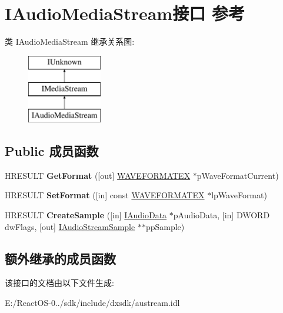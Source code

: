 \hypertarget{interface_i_audio_media_stream}{}\section{I\+Audio\+Media\+Stream接口 参考}
\label{interface_i_audio_media_stream}
类 I\+Audio\+Media\+Stream 继承关系图\+:\begin{figure}[H]
\begin{center}
\leavevmode
\includegraphics[height=3.000000cm]{interface_i_audio_media_stream}
\end{center}
\end{figure}
\subsection*{Public 成员函数}
\begin{DoxyCompactItemize}
\item 
\mbox{\label{interface_i_audio_media_stream_a274b9d811563ae79051cfe28fbc64e18}} 
H\+R\+E\+S\+U\+LT {\bfseries Get\+Format} (\mbox{[}out\mbox{]} \hyperlink{struct_w_a_v_e_f_o_r_m_a_t_e_x}{W\+A\+V\+E\+F\+O\+R\+M\+A\+T\+EX} $\ast$p\+Wave\+Format\+Current)
\item 
\mbox{\label{interface_i_audio_media_stream_adeb9dfefa56eea10e76c55cb7180cafc}} 
H\+R\+E\+S\+U\+LT {\bfseries Set\+Format} (\mbox{[}in\mbox{]} const \hyperlink{struct_w_a_v_e_f_o_r_m_a_t_e_x}{W\+A\+V\+E\+F\+O\+R\+M\+A\+T\+EX} $\ast$lp\+Wave\+Format)
\item 
\mbox{\label{interface_i_audio_media_stream_a50380f76cfebe93cf91bbd80b6257a69}} 
H\+R\+E\+S\+U\+LT {\bfseries Create\+Sample} (\mbox{[}in\mbox{]} \hyperlink{interface_i_audio_data}{I\+Audio\+Data} $\ast$p\+Audio\+Data, \mbox{[}in\mbox{]} D\+W\+O\+RD dw\+Flags, \mbox{[}out\mbox{]} \hyperlink{interface_i_audio_stream_sample}{I\+Audio\+Stream\+Sample} $\ast$$\ast$pp\+Sample)
\end{DoxyCompactItemize}
\subsection*{额外继承的成员函数}


该接口的文档由以下文件生成\+:\begin{DoxyCompactItemize}
\item 
E\+:/\+React\+O\+S-\/0../sdk/include/dxsdk/austream.\+idl\end{DoxyCompactItemize}
